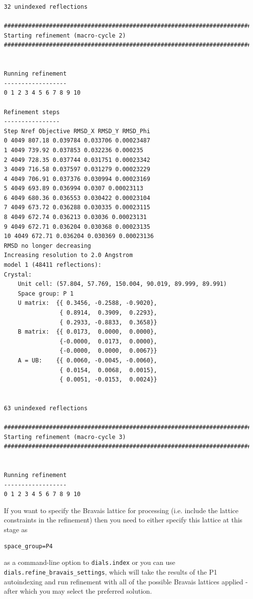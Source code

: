 \documentclass[a4paper, 11pt]{article}
\begin{document}
{\begin{verbatim}
32 unindexed reflections

################################################################################
Starting refinement (macro-cycle 2)
################################################################################


Running refinement
------------------
0 1 2 3 4 5 6 7 8 9 10

Refinement steps
----------------
Step Nref Objective RMSD_X RMSD_Y RMSD_Phi
0 4049 807.18 0.039784 0.033706 0.00023487 
1 4049 739.92 0.037853 0.032236 0.000235 
2 4049 728.35 0.037744 0.031751 0.00023342 
3 4049 716.58 0.037597 0.031279 0.00023229 
4 4049 706.91 0.037376 0.030994 0.00023169 
5 4049 693.89 0.036994 0.0307 0.00023113 
6 4049 680.36 0.036553 0.030422 0.00023104 
7 4049 673.72 0.036288 0.030335 0.00023115 
8 4049 672.74 0.036213 0.03036 0.00023131 
9 4049 672.71 0.036204 0.030368 0.00023135 
10 4049 672.71 0.036204 0.030369 0.00023136 
RMSD no longer decreasing
Increasing resolution to 2.0 Angstrom
model 1 (48411 reflections):
Crystal:
    Unit cell: (57.804, 57.769, 150.004, 90.019, 89.999, 89.991)
    Space group: P 1
    U matrix:  {{ 0.3456, -0.2588, -0.9020},
                { 0.8914,  0.3909,  0.2293},
                { 0.2933, -0.8833,  0.3658}}
    B matrix:  {{ 0.0173,  0.0000,  0.0000},
                {-0.0000,  0.0173,  0.0000},
                {-0.0000,  0.0000,  0.0067}}
    A = UB:    {{ 0.0060, -0.0045, -0.0060},
                { 0.0154,  0.0068,  0.0015},
                { 0.0051, -0.0153,  0.0024}}


63 unindexed reflections

################################################################################
Starting refinement (macro-cycle 3)
################################################################################


Running refinement
------------------
0 1 2 3 4 5 6 7 8 9 10
\end{verbatim}
}

If you want to specify the Bravais lattice for processing
(i.e. include the lattice constraints in the refinement) then you need
to either specify this lattice at this stage as

{\small
\begin{verbatim}
space_group=P4
\end{verbatim}
}

\noindent
as a command-line option to \verb|dials.index| or you can use
\verb|dials.refine_bravais_settings|, which will take the results of
the P1 autoindexing and run refinement with all of the possible
Bravais lattices applied - after which you may select the preferred
solution.
\end{document}
